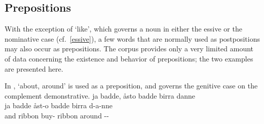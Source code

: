 \subsection{Prepositions}\label{prepositions}
With the exception of  ‘like’, which governs a noun in either the essive or the nominative case (cf.~\SEC\ref{essive}), 
a few words that are normally used as postpositions may also occur as prepositions. 
The corpus provides only a very limited amount of data concerning the existence and behavior of prepositions; the two examples are presented here. 

In ,  ‘about, around’ is used as a preposition, and governs the genitive case on the complement demonstrative. 
\ea\label{prepositionEx1}%
\glll	ja badde, åsto badde birra danne\\
	ja badde åst-o badde birra d-a-nne\\
	and ribbon\BS{} buy-\BS{} ribbon\BS{} around --\\\nopagebreak
{}	
\z

